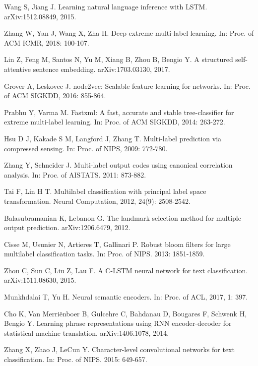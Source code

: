 \documentclass[runningheads]{llncs}
\begin{document}
\begin{thebibliography}{8}
Wang S, Jiang J. Learning natural language inference with LSTM. arXiv:1512.08849, 2015.

Zhang W, Yan J, Wang X, Zha H. Deep extreme multi-label learning. In: Proc. of ACM ICMR, 2018: 100-107.

Lin Z, Feng M, Santos N, Yu M, Xiang B, Zhou B, Bengio Y. A structured self-attentive sentence embedding. arXiv:1703.03130, 2017.


Grover A, Leskovec J. node2vec: Scalable feature learning for networks. In: Proc. of ACM SIGKDD, 2016: 855-864.


Prabhu Y, Varma M. Fastxml: A fast, accurate and stable tree-classifier for extreme multi-label learning. In: Proc. of ACM SIGKDD, 2014: 263-272.

Hsu D J, Kakade S M, Langford J, Zhang T. Multi-label prediction via compressed sensing. In: Proc. of NIPS, 2009: 772-780.

Zhang Y, Schneider J. Multi-label output codes using canonical correlation analysis. In: Proc. of AISTATS. 2011: 873-882.

Tai F, Lin H T. Multilabel classification with principal label space transformation. Neural Computation, 2012, 24(9): 2508-2542.

Balasubramanian K, Lebanon G. The landmark selection method for multiple output prediction. arXiv:1206.6479, 2012.

Cisse M, Usunier N, Artieres T, Gallinari P. Robust bloom filters for large multilabel classification tasks. In: Proc. of NIPS. 2013: 1851-1859.

Zhou C, Sun C, Liu Z, Lau F. A C-LSTM neural network for text classification. arXiv:1511.08630, 2015.

Munkhdalai T, Yu H. Neural semantic encoders. In: Proc. of ACL, 2017, 1: 397.

Cho K, Van Merriënboer B, Gulcehre C, Bahdanau D, Bougares F, Schwenk H, Bengio Y. Learning phrase representations using RNN encoder-decoder for statistical machine translation. arXiv:1406.1078, 2014.

Zhang X, Zhao J, LeCun Y. Character-level convolutional networks for text classification. In: Proc. of NIPS. 2015: 649-657.


\end{thebibliography}
\end{document}
